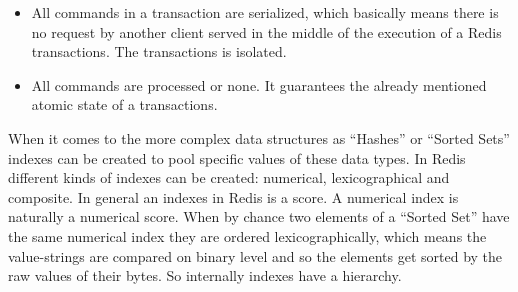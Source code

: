 \begin{itemize}
	\item All commands in a transaction are serialized, which basically means there is no request by another client served in the middle of the execution of a Redis transactions. The transactions is isolated.
	\item All commands are processed or none. It guarantees the already mentioned atomic state of a transactions.
\end{itemize}

When it comes to the more complex data structures as “Hashes” or “Sorted Sets” indexes can be created to pool specific values of these data types. In Redis different kinds of indexes can be created: numerical, lexicographical and composite. In general an indexes in Redis is a score. A numerical index is naturally a numerical score. When by chance two elements of a “Sorted Set” have the same numerical index they are ordered lexicographically, which means the value-strings are compared on binary level and so the elements get sorted by the raw values of their bytes. So internally indexes have a hierarchy. 